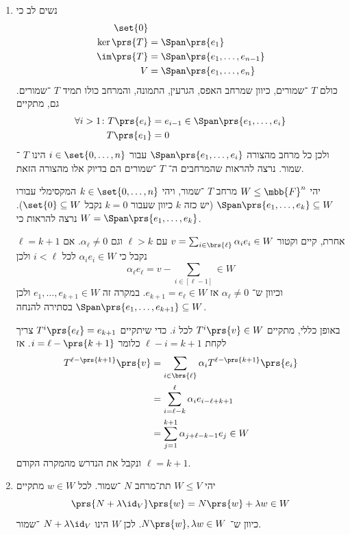 \documentclass[a4paper,10pt,twoside,openany]{book}
\begin{document}
\begin{solution}
\begin{enumerate}
\item
נשים לב כי
\begin{align*}
\set{0} & \\
\ker\prs{T} &= \Span\prs{e_1} \\
\im\prs{T} &= \Span\prs{e_1, \ldots, e_{n-1}} \\
V &= \Span\prs{e_1, \ldots, e_n}
\end{align*}
כולם
$T$%
־שמורים, כיוון שמרחב האפס, הגרעין, התמונה, והמרחב כולו תמיד
$T$%
־שמורים.
גם, מתקיים
\begin{align*}
\forall i > 1 \colon T\prs{e_i} &= e_{i-1} \in \Span\prs{e_1, \ldots, e_i} \\
T\prs{e_1} &= 0
\end{align*}
ולכן כל מרחב מהצורה
$\Span\prs{e_1, \ldots, e_i}$
עבור
$i \in \set{0, \ldots, n}$
הינו
$T$%
־שמור.
נרצה להראות שהמרחבים ה־%
$T$%
־שמורים הם בדיוק אלו מהצורה
הזאת.

יהי
$W \leq \mbb{F}^n$
מרחב
$T$%
־שמור, ויהי
$k \in \set{0, \ldots, n}$
המקסימלי עבורו
$\Span\prs{e_1, \ldots, e_k} \subseteq W$
(יש כזה
$k$
כיוון שעבור
$k = 0$
נקבל
$\set{0} \subseteq W$).
נרצה להראות כי
$W = \Span\prs{e_1, \ldots, e_k}$.

אחרת, קיים וקטור
$v = \sum_{i \in \brs{\ell}} \alpha_i e_i \in W$
עם
$\ell > k$
וגם
$\alpha_\ell \neq 0$.
אם
$\ell = k+1$
נקבל כי
$\alpha_i e_i \in W$
לכל
$i < \ell$
ולכן
\[\alpha_\ell e_\ell = v - \sum_{i \in [\ell - 1]} \in W\]
וכיוון ש־%
$\alpha_\ell \neq 0$
אז
$e_{k+1} = e_\ell \in W$.
במקרה זה
$e_1, \ldots, e_{k+1} \in W$
ולכן
$\Span\prs{e_1, \ldots, e_{k+1}} \subseteq W$
בסתירה להנחה.

באופן כללי, מתקיים
$T^i\prs{v} \in W$
לכל
$i$.
כדי שיתקיים
$T^i\prs{e_\ell} = e_{k+1}$
צריך לקחת
$\ell - i = k+1$
כלומר
$i = \ell - \prs{k+1}$.
אז
\begin{align*}
T^{\ell - \prs{k+1}} \prs{v} &= \sum_{i \in \brs{\ell}} \alpha_i T^{\ell - \prs{k+1}}\prs{e_i}
\\&= \sum_{i = \ell - k}^{\ell} \alpha_i e_{i - \ell + k + 1}
\\&= \sum_{j = 1}^{k+1} \alpha_{j+\ell-k-1} e_j \in W
\end{align*}
ונקבל את הנדרש מהמקרה הקודם
$\ell = k+1$.

\item
יהי
$W \leq V$
תת־מרחב
$N$%
־שמור. לכל
$w \in W$
מתקיים
\[\prs{N + \lambda \id_V}\prs{w} = N\prs{w} + \lambda w \in W\]
כיוון ש־%
$N\prs{w}, \lambda w \in W$.
לכן
$W$
הינו
$N + \lambda \id_V$%
־שמור.


\end{enumerate}
\end{solution}
\end{document}
